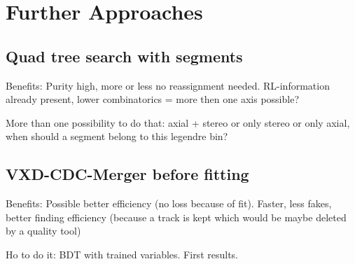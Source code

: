 \section{Further Approaches} \label{section-outlook}
\subsection{Quad tree search with segments}
Benefits: Purity high, more or less no reassignment needed. RL-information already present, lower combinatorics = more then one axis possible?

More than one possibility to do that: axial + stereo or only stereo or only axial, when should a segment belong to this legendre bin?

\subsection{VXD-CDC-Merger before fitting}
Benefits: Possible better efficiency (no loss because of fit). Faster, less fakes, better finding efficiency (because a track is kept which would be maybe deleted by a quality tool)

Ho to do it: BDT with trained variables. First results.